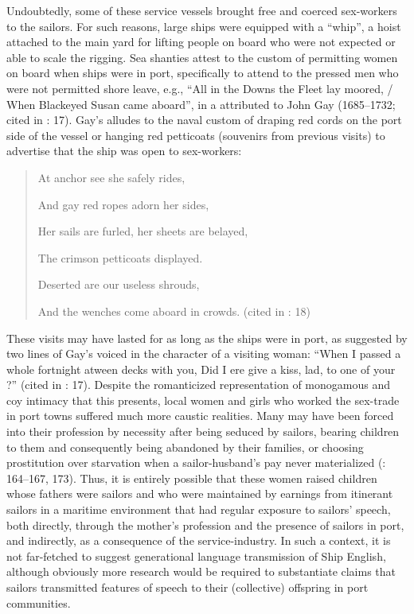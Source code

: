 Undoubtedly, some of these service vessels brought free and coerced sex-workers to the sailors. For such reasons, large ships were equipped with a “whip”, a hoist attached to the main yard for lifting people on board who were not expected or able to scale the rigging. Sea shanties attest to the custom of permitting women on board when ships were in port, specifically to attend to the pressed men who were not permitted shore leave, e.g.,  “All in the Downs the Fleet lay moored, / When Blackeyed Susan came aboard”, in a  attributed to John Gay (1685–1732; cited in \citealt{Hugill1969}: 17). Gay's  alludes to the naval custom of draping red cords on the port side of the vessel or hanging red petticoats (souvenirs from previous visits) to advertise that the ship was open to sex-workers: 

\begin{quotation}
At anchor see she safely rides, 

And gay red ropes adorn her sides, 

Her sails are furled, her sheets are belayed, 

The crimson petticoats displayed. 

Deserted are our useless shrouds, 

And the wenches come aboard in crowds. (cited in \citealt{Hugill1969}: 18)
\end{quotation}

These visits may have lasted for as long as the ships were in port, as suggested by two lines of Gay's  voiced in the character of a visiting woman: “When I passed a whole fortnight atween decks with you, Did I ere give a kiss, lad, to one of your ?” (cited in \citealt{Hugill1969}: 17). Despite the romanticized representation of monogamous and coy intimacy that this  presents, local women and girls who worked the sex-trade in port towns suffered much more caustic realities. Many may have been forced into their profession by necessity after being seduced by sailors, bearing children to them and consequently being abandoned by their families, or choosing prostitution over starvation when a sailor-husband’s pay never materialized (\citealt{AdkinsAdkins2008}: 164–167, 173). Thus, it is entirely possible that these women raised children whose fathers were sailors and who were maintained by earnings from itinerant sailors in a maritime environment that had regular exposure to sailors’ speech, both directly, through the mother’s profession and the presence of sailors in port, and indirectly, as a consequence of the service-industry. In such a context, it is not far-fetched to suggest generational language transmission of Ship English, although obviously more research would be required to substantiate claims that sailors transmitted features of speech to their (collective) offspring in port communities. 

